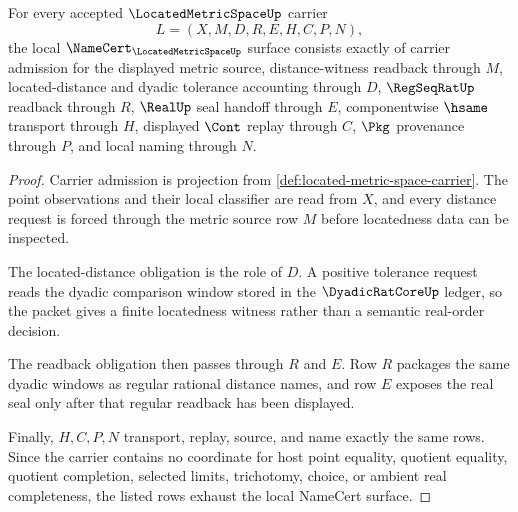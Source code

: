 \begin{theorem}
\label{thm:located-metric-space-namecert-obligations}
For every accepted $\LocatedMetricSpaceUp$ carrier
$$
L=(X,M,D,R,E,H,C,P,N),
$$
the local $\NameCert_{\LocatedMetricSpaceUp}$ surface consists exactly of carrier admission for the displayed metric source, distance-witness readback through $M$, located-distance and dyadic tolerance accounting through $D$, $\RegSeqRatUp$ readback through $R$, $\RealUp$ seal handoff through $E$, componentwise $\hsame$ transport through $H$, displayed $\Cont$ replay through $C$, $\Pkg$ provenance through $P$, and local naming through $N$.
\end{theorem}
\begin{proof}
Carrier admission is projection from \autoref{def:located-metric-space-carrier}. The point observations and their local classifier are read from $X$, and every distance request is forced through the metric source row $M$ before locatedness data can be inspected.

The located-distance obligation is the role of $D$. A positive tolerance request reads the dyadic comparison window stored in the $\DyadicRatCoreUp$ ledger, so the packet gives a finite locatedness witness rather than a semantic real-order decision.

The readback obligation then passes through $R$ and $E$. Row $R$ packages the same dyadic windows as regular rational distance names, and row $E$ exposes the real seal only after that regular readback has been displayed.

Finally, $H,C,P,N$ transport, replay, source, and name exactly the same rows. Since the carrier contains no coordinate for host point equality, quotient equality, quotient completion, selected limits, trichotomy, choice, or ambient real completeness, the listed rows exhaust the local NameCert surface.
\end{proof}

